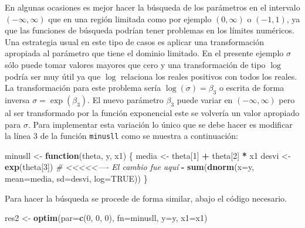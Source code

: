 \documentclass[10pt,]{krantz}
\makeatletter
\newenvironment{Shaded}{\begin{snugshade}}{\end{snugshade}}
\newcommand{\KeywordTok}[1]{\textcolor[rgb]{0.13,0.29,0.53}{\textbf{#1}}}
\newcommand{\DataTypeTok}[1]{\textcolor[rgb]{0.13,0.29,0.53}{#1}}
\newcommand{\DecValTok}[1]{\textcolor[rgb]{0.00,0.00,0.81}{#1}}
\newcommand{\StringTok}[1]{\textcolor[rgb]{0.31,0.60,0.02}{#1}}
\newcommand{\CommentTok}[1]{\textcolor[rgb]{0.56,0.35,0.01}{\textit{#1}}}
\newcommand{\OtherTok}[1]{\textcolor[rgb]{0.56,0.35,0.01}{#1}}
\newcommand{\ControlFlowTok}[1]{\textcolor[rgb]{0.13,0.29,0.53}{\textbf{#1}}}
\newcommand{\OperatorTok}[1]{\textcolor[rgb]{0.81,0.36,0.00}{\textbf{#1}}}
\newcommand{\NormalTok}[1]{#1}
\newenvironment{kframe}{%
\medskip{}
\setlength{\fboxsep}{.8em}
 \def\at@end@of@kframe{}%
 \ifinner\ifhmode%
  \def\at@end@of@kframe{\end{minipage}}%
  \begin{minipage}{\columnwidth}%
 \fi\fi%
 \def\FrameCommand##1{\hskip\@totalleftmargin \hskip-\fboxsep
 \colorbox{shadecolor}{##1}\hskip-\fboxsep
     \hskip-\linewidth \hskip-\@totalleftmargin \hskip\columnwidth}%
 \MakeFramed {\advance\hsize-\width
   \@totalleftmargin\z@ \linewidth\hsize
   \@setminipage}}%
 {\par\unskip\endMakeFramed%
 \at@end@of@kframe}
\renewenvironment{Shaded}{\begin{kframe}}{\end{kframe}}
\makeatother
\begin{document}
En algunas ocasiones es mejor hacer la búsqueda de los parámetros en el
intervalo \((-\infty, \infty)\) que en una región limitada como por
ejemplo \((0, \infty)\) o \((-1, 1)\), ya que las funciones de búsqueda
podrían tener problemas en los límites numéricos. Una estrategia usual
en este tipo de casos es aplicar una transformación apropiada al
parámetro que tiene el dominio limitado. En el presente ejemplo
\(\sigma\) sólo puede tomar valores mayores que cero y una
transformación de tipo \(\log\) podría ser muy útil ya que \(\log\)
relaciona los reales positivos con todos los reales. La transformación
para este problema sería \(\log(\sigma)=\beta_3\) o escrita de forma
inversa \(\sigma=\exp(\beta_3)\). El nuevo parámetro \(\beta_3\) puede
variar en \((-\infty, \infty)\) pero al ser transformado por la función
exponencial este se volvería un valor apropiado para \(\sigma\). Para
implementar esta variación lo único que se debe hacer es modificar la
línea 3 de la función \texttt{minusll} como se muestra a continuación:

\begin{Shaded}
\begin{Highlighting}[]
\NormalTok{minusll <-}\StringTok{ }\ControlFlowTok{function}\NormalTok{(theta, y, x1) \{}
\NormalTok{  media <-}\StringTok{ }\NormalTok{theta[}\DecValTok{1}\NormalTok{] }\OperatorTok{+}\StringTok{ }\NormalTok{theta[}\DecValTok{2}\NormalTok{] }\OperatorTok{*}\StringTok{ }\NormalTok{x1  }
\NormalTok{  desvi <-}\StringTok{ }\KeywordTok{exp}\NormalTok{(theta[}\DecValTok{3}\NormalTok{])  }\CommentTok{# <<<<<---- El cambio fue aquí}
  \OperatorTok{-}\StringTok{ }\KeywordTok{sum}\NormalTok{(}\KeywordTok{dnorm}\NormalTok{(}\DataTypeTok{x=}\NormalTok{y, }\DataTypeTok{mean=}\NormalTok{media, }\DataTypeTok{sd=}\NormalTok{desvi, }\DataTypeTok{log=}\OtherTok{TRUE}\NormalTok{))}
\NormalTok{\}}
\end{Highlighting}
\end{Shaded}

Para hacer la búsqueda se procede de forma similar, abajo el código
necesario.

\begin{Shaded}
\begin{Highlighting}[]
\NormalTok{res2 <-}\StringTok{ }\KeywordTok{optim}\NormalTok{(}\DataTypeTok{par=}\KeywordTok{c}\NormalTok{(}\DecValTok{0}\NormalTok{, }\DecValTok{0}\NormalTok{, }\DecValTok{0}\NormalTok{), }\DataTypeTok{fn=}\NormalTok{minusll, }\DataTypeTok{y=}\NormalTok{y, }\DataTypeTok{x1=}\NormalTok{x1)}
\end{Highlighting}
\end{Shaded}
\end{document}
